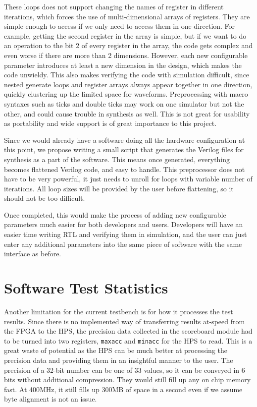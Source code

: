 These loops does not support changing the names of register in different iterations, which forces the use of multi-dimensional arrays of registers.
They are simple enough to access if we only need to access them in one direction.
For example, getting the second register in the array is simple, but if we want to do an operation to the bit 2 of every register in the array, the code gets complex and even worse if there are more than 2 dimensions.
However, each new configurable parameter introduces at least a new dimension in the design, which makes the code unwieldy.
This also makes verifying the code with simulation difficult, since nested generate loops and register arrays always appear together in one direction, quickly clustering up the limited space for waveforms.
Preprocessing with macro syntaxes such as ticks and double ticks may work on one simulator but not the other, and could cause trouble in synthesis as well.
This is not great for usability as portability and wide support is of great importance to this project.

Since we would already have a software doing all the hardware configuration at this point, we propose writing a small script that generates the Verilog files for synthesis as a part of the software.
This means once generated, everything becomes flattened Verilog code, and easy to handle.
This preprocessor does not have to be very powerful, it just needs to unroll for loops with variable number of iterations.
All loop sizes will be provided by the user before flattening, so it should not be too difficult.

Once completed, this would make the process of adding new configurable parameters much easier for both developers and users.
Developers will have an easier time writing RTL and verifying them in simulation, and the user can just enter any additional parameters into the same piece of software with the same interface as before.

\section{Software Test Statistics}

Another limitation for the current testbench is for how it processes the test results.
Since there is no implemented way of transferring results at-speed from the FPGA to the HPS, the precision data collected in the scoreboard module had to be turned into two registers, \texttt{maxacc} and \texttt{minacc} for the HPS to read.
This is a great waste of potential as the HPS can be much better at processing the precision data and providing them in an insightful manner to the user.
The precision of a 32-bit number can be one of 33 values, so it can be conveyed in 6 bits without additional compression.
They would still fill up any on chip memory fast.
At 400MHz, it still fills up 300MB of space in a second even if we assume byte alignment is not an issue.

